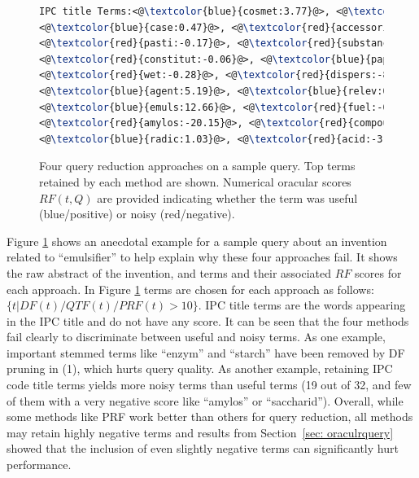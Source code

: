 \begin{figure}[t!]
\begin{framed}
\begin{lstlisting}[basicstyle=\small\ttfamily , linewidth=\columnwidth,breaklines=true, language=TeX]
IPC title Terms:<@\textcolor{blue}{cosmet:3.77}@>, <@\textcolor{blue}{toilet:0.18}@>, <@\textcolor{red}{prepar:-0.82}@>, 
<@\textcolor{blue}{case:0.47}@>, <@\textcolor{red}{accessori:-0.01}@>, <@\textcolor{red}{store:-0.37}@>, <@\textcolor{blue}{handl:0.07}@>, 
<@\textcolor{red}{pasti:-0.17}@>, <@\textcolor{red}{substanc:-1.21}@>, <@\textcolor{red}{fibrou:-0.01}@>, <@\textcolor{red}{pulp:-1.28}@>, 
<@\textcolor{red}{constitut:-0.06}@>, <@\textcolor{blue}{paper:1.26}@>, <@\textcolor{red}{impregn:-0.11}@>, <@\textcolor{blue}{emulsifi:6.72}@>, 
<@\textcolor{red}{wet:-0.28}@>, <@\textcolor{red}{dispers:-8.66}@>, <@\textcolor{red}{foam:-0.49}@>, <@\textcolor{red}{produc:-0.57}@>, 
<@\textcolor{blue}{agent:5.19}@>, <@\textcolor{blue}{relev:0.18}@>, <@\textcolor{blue}{class:0.053}@>, <@\textcolor{red}{lubric:-0.38}@>, 
<@\textcolor{blue}{emuls:12.66}@>, <@\textcolor{red}{fuel:-0.011}@>, <@\textcolor{blue}{deriv:11.97}@>, <@\textcolor{blue}{starch:14.64}@>, 
<@\textcolor{red}{amylos:-20.15}@>, <@\textcolor{red}{compound:-0.63}@>, <@\textcolor{red}{saccharid:-11.95}@>, 
<@\textcolor{blue}{radic:1.03}@>, <@\textcolor{red}{acid:-3.19}@> 
 \end{lstlisting} 
 \vspace*{-2ex}
\end{framed}
 \vspace*{-2ex}
  \caption{Four query reduction approaches on a sample query.  Top
    terms retained by each method are shown.  Numerical oracular
    scores $\mathit{RF}(t,Q)$ are provided indicating whether the term
    was useful (blue/positive) or noisy (red/negative).}
  \label{fig:anecdotal}  
\end{figure}

Figure \ref{fig:anecdotal} shows an anecdotal example for a sample query about an invention related to ``emulsifier'' to help explain why these four approaches fail. It shows the raw abstract of the invention, and terms and their associated $\mathit{RF}$ scores for each approach. In Figure \ref{fig:anecdotal} terms are chosen for each approach  as follows: $\{t| DF(t)/QTF(t)/PRF(t)>10\}$. IPC title terms are the words appearing in the IPC title and do not have any score.
It can be seen that the four methods fail clearly to discriminate between useful and noisy terms. As one example, important stemmed terms like ``enzym'' and ``starch'' have been removed by DF pruning in (1), which hurts query quality.  As another example, retaining IPC code title terms yields more noisy terms than useful terms (19 out of 32, and few of them with a very negative score like ``amylos'' or ``saccharid''). Overall, while some methods like PRF work better than others for query reduction, all methods may retain highly negative terms and results from Section~\ref{sec: oraculrquery} showed that the inclusion of even slightly negative terms can significantly hurt performance.
